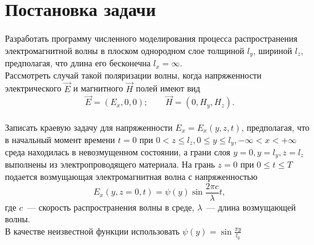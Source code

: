 \chapter*{Постановка задачи}
Разработать программу численного моделирования процесса
распространения электромагнитной волны в плоском однородном слое
толщиной $l_y$, шириной $l_z$, предполагая, что длина его бесконечна
$l_x = \infty$.\\

Рассмотреть случай такой поляризации волны, когда напряженности
электрического $\vec{E}$ и магнитного $\vec{H}$ полей имеют вид
\[
\vec{E} = (E_x, 0, 0);\qquad\vec{H} = (0, H_y, H_z).
\]
\\
Записать краевую задачу для напряженности $E_x = E_x(y, z, t)$,
предполагая, что в начальный момент времени $t = 0$ при $0 < z \le
l_z, 0 \le y \le l_y, -\infty < x < +\infty$ среда находилась в
невозмущенном состоянии, а грани слоя $y = 0, y = l_y, z = l_z$
выполнены из электропроводящего материала. На грань $z = 0$ при $0 \le
t \le T$ подается возмущающая электромагнитная волна с напряженностью
\[
E_x(y, z=0, t) = \psi(y) \sin \frac{2\pi c}{\lambda}t,
\]
где $c$~--- скорость распространения волны в среде, $\lambda$~---
длина возмущающей волны.
\\
В качестве неизвестной функции использовать $\psi(y) = \sin\frac{\pi y}{l_y}$
